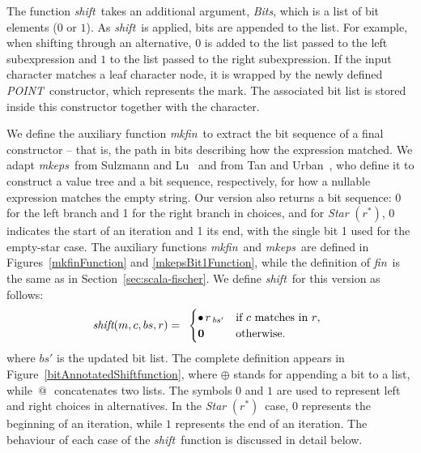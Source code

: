 \documentclass[12pt]{article}
\makeatletter
\newcommand{\ZERO}{\textbf{0}}
\newcommand{\shift}{\textit{shift}}
\newcommand{\mkeps}{\textit{mkeps}}
\newcommand{\Marked}[1]{\bullet\,#1}
\newcommand{\fin}{\textit{fin}}
\newcommand{\Bits}{\textit{Bits}}
\newcommand{\POINT}{\textit{POINT}}
\newcommand{\mkfin}{\textit{mkfin}}
\newcommand{\STARText}{\textit{Star} $(r^*)$}
\newcommand{\At}{$\,@\,$}
\makeatother
\begin{document}
The function \shift\ takes an additional argument, \Bits, which is a list of bit elements ($0$ or $1$).  
As \shift\ is applied, bits are appended to the list.  
For example, when shifting through an alternative, $0$ is added to the list passed to the left subexpression 
and $1$ to the list passed to the right subexpression.  
If the input character matches a leaf character node, it is wrapped by the newly defined \POINT\ constructor, 
which represents the mark.  
The associated bit list is stored inside this constructor together with the character.  

We define the auxiliary function \mkfin\ to extract the bit sequence of a final constructor -- 
that is, the path in bits describing how the expression matched.  
We adapt \mkeps\ from Sulzmann and Lu~\cite{Sulzmann2014} and from Tan and Urban~\cite{TanAndUrban2023}, 
who define it to construct a value tree and a bit sequence, respectively, 
for how a nullable expression matches the empty string.  
Our version also returns a bit sequence: 0 for the left branch and 1 for the right branch in choices, 
and for \STARText, 0 indicates the start of an iteration and 1 its end, 
with the single bit 1 used for the empty-star case. 
The auxiliary functions \mkfin\ and \mkeps\ are defined
 in Figures~\ref{mkfinFunction} and \ref{mkepsBit1Function}, while the definition of \fin\ is the same as in
  Section~\ref{sec:scala-fischer}. We define \shift\ for this version as follows:
\[
\renewcommand{\arraystretch}{1.5}
\shift(m, c, bs, r) =
\begin{array}{l}
  \begin{cases}
    \Marked{r\,_{bs'}} & \text{if $c$ matches in $r$}, \\
    \ZERO\,        & \text{otherwise.}
  \end{cases} 

\end{array}
\renewcommand{\arraystretch}{1.0}
\]
where $bs'$ is the updated bit list. The complete definition appears in Figure~\ref{bitAnnotatedShiftfunction}, where $\oplus$
 stands for appending a bit to a list, while \At\ concatenates two lists.  
The symbols $0$ and $1$ are used to represent left and right choices in alternatives.  
In the \STARText\ case, $0$ represents the beginning of an iteration, while $1$ represents the end of an iteration. 
The behaviour of each case of the \shift\ function is discussed in detail below.
\end{document}

